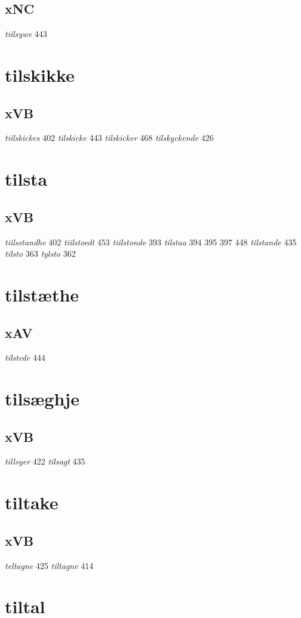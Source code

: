 \documentclass[a4paper,twocolumn]{article}
\begin{document}
\subsection{xNC}
\label{sec:org7646f2c}
\emph{tiilsywe} 443 
\section{tilskikke}
\label{sec:orgbe0db13}
\subsection{xVB}
\label{sec:org5a91e81}
\emph{tiilskickes} 402 \emph{tilskicke} 443 \emph{tilskicker} 468 \emph{tilskyckende} 426 
\section{tilsta}
\label{sec:org1b65c8a}
\subsection{xVB}
\label{sec:org68d2c0d}
\emph{tiilsstandhe} 402 \emph{tiilstoedt} 453 \emph{tiilstonde} 393 \emph{tilstaa} 394 395 397 448 \emph{tilstande} 435 \emph{tilsto} 363 \emph{tylsto} 362 
\section{tilstæthe}
\label{sec:org5732102}
\subsection{xAV}
\label{sec:org91f3ef0}
\emph{tilstede} 444 
\section{tilsæghje}
\label{sec:orgd820a76}
\subsection{xVB}
\label{sec:org7b1fab1}
\emph{tillsyer} 422 \emph{tilsagt} 435 
\section{tiltake}
\label{sec:orgf0aa322}
\subsection{xVB}
\label{sec:org8d0896d}
\emph{teltagne} 425 \emph{tiltagne} 414 
\section{tiltal}
\label{sec:org13f17d4}
\end{document}

